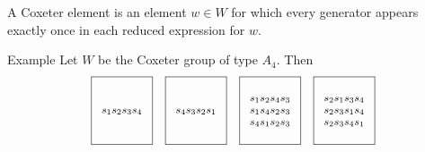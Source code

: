 \documentclass[9pt]{beamer}
\begin{document}
\begin{frame}
\begin{definition} A \alert{Coxeter element} is an element $w \in W$ for which every generator appears exactly once in each reduced expression for $w$.
\end{definition}
    \pause
\begin{block}{Example} Let $W$ be the Coxeter group of type $A_4$. Then  
%    
%         
%         
%         
$${\footnotesize \begin{array}{cccc}
    \boxed{\begin{array}{c} \\ \\ s_1s_2s_3s_4 \\ \\ \\\end{array}} &
    \boxed{\begin{array}{c} \\ \\ s_4s_3s_2s_1 \\ \\ \\\end{array}} & 
    \boxed{\begin{array}{c} \\ s_1s_2s_4s_3 \\ s_1s_4s_2s_3 \\ s_4s_1s_2s_3 \\ \\ \end{array}} & 
    \boxed{\begin{array}{c} \\ s_2s_1s_3s_4 \\ s_2s_3s_1s_4 \\ s_2s_3s_4s_1 \\ \\ \end{array}} \\ &&& \\

\end{array}}$$
\end{block}
\end{frame}
\end{document}
